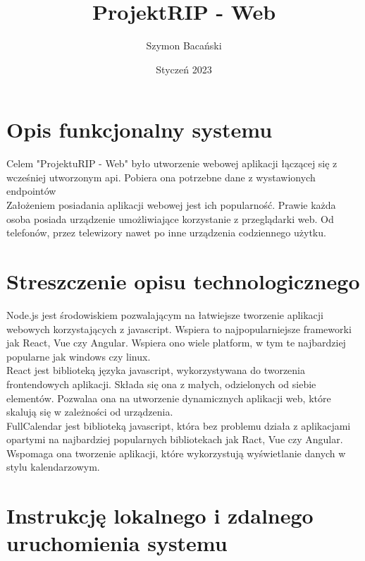 \documentclass{article}
\title{Projekt\textunderscore RIP - Web}
\author{
Szymon Bacański
}
\date{Styczeń 2023}
\begin{document}
\maketitle

\section{Opis funkcjonalny systemu}
Celem "Projektu\textunderscore RIP - Web" było utworzenie webowej aplikacji łączącej się z wcześniej utworzonym api. Pobiera ona potrzebne dane z wystawionych endpointów 
\\
Założeniem posiadania aplikacji webowej jest ich popularność. Prawie każda osoba posiada urządzenie umożliwiające korzystanie z przeglądarki web. Od telefonów, przez telewizory nawet po inne urządzenia codziennego użytku.

\section{Streszczenie opisu technologicznego}
Node.js jest środowiskiem pozwalającym na łatwiejsze tworzenie aplikacji webowych korzystających z javascript. Wspiera to najpopularniejsze frameworki jak React, Vue czy Angular. Wspiera ono wiele platform, w tym te najbardziej popularne jak windows czy linux.  
\\
React jest biblioteką języka javascript, wykorzystywana do tworzenia frontendowych aplikacji. Składa się ona z małych, odzielonych od siebie elementów. Pozwalaa ona na utworzenie dynamicznych aplikacji web, które skalują się w zależności od urządzenia.
\\
FullCalendar jest biblioteką javascript, która bez problemu działa z aplikacjami opartymi na najbardziej popularnych bibliotekach jak Ract, Vue czy Angular. Wspomaga ona tworzenie aplikacji, które wykorzystują wyświetlanie danych w stylu kalendarzowym.


\section{Instrukcję lokalnego i zdalnego uruchomienia systemu}
\end{document}
